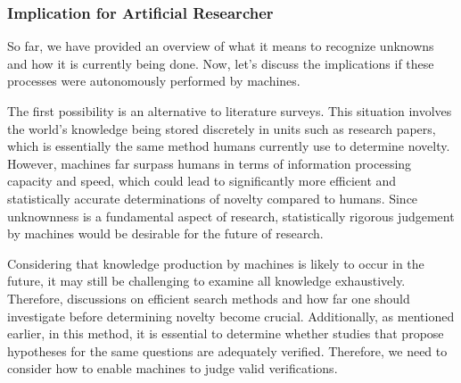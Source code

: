 \documentclass{book}
\begin{document}
\subsubsection{Implication for Artificial Researcher}
So far, we have provided an overview of what it means to recognize unknowns and how it is currently being done. Now, let's discuss the implications if these processes were autonomously performed by machines.

The first possibility is an alternative to literature surveys. This situation involves the world's knowledge being stored discretely in units such as research papers, which is essentially the same method humans currently use to determine novelty. However, machines far surpass humans in terms of information processing capacity and speed, which could lead to significantly more efficient and statistically accurate determinations of novelty compared to humans. Since unknownness is a fundamental aspect of research, statistically rigorous judgement by machines would be desirable for the future of research.


Considering that knowledge production by machines is likely to occur in the future, it may still be challenging to examine all knowledge exhaustively. Therefore, discussions on efficient search methods and how far one should investigate before determining novelty become crucial. Additionally, as mentioned earlier, in this method, it is essential to determine whether studies that propose hypotheses for the same questions are adequately verified. Therefore, we need to consider how to enable machines to judge valid verifications.
\end{document}
